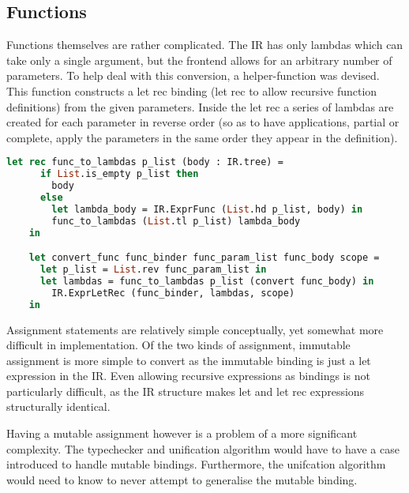 \documentclass{l4proj}
\begin{document}
\subsection{Functions}
Functions themselves are rather complicated.
The IR has only lambdas which can take only a single argument, but the frontend allows for an arbitrary number of parameters.
To help deal with this conversion, a helper-function was devised.
This function constructs a let rec binding (let rec to allow recursive function definitions) from the given parameters.
Inside the let rec a series of lambdas are created for each parameter in reverse order (so as to have applications, partial or complete, apply the parameters in the same order they appear in the definition).

\begin{lstlisting}[language=Caml, keepspaces=true, caption=PyFunc frontend's function binding conversion code.]
    let rec func_to_lambdas p_list (body : IR.tree) =
      if List.is_empty p_list then
        body
      else
        let lambda_body = IR.ExprFunc (List.hd p_list, body) in
        func_to_lambdas (List.tl p_list) lambda_body
    in

    let convert_func func_binder func_param_list func_body scope =
      let p_list = List.rev func_param_list in
      let lambdas = func_to_lambdas p_list (convert func_body) in
        IR.ExprLetRec (func_binder, lambdas, scope)
    in
\end{lstlisting}


Assignment statements are relatively simple conceptually, yet somewhat more difficult in implementation.
Of the two kinds of assignment, immutable assignment is more simple to convert as the immutable binding is just a let expression in the IR.
Even allowing recursive expressions as bindings is not particularly difficult, as the IR structure makes let and let rec expressions structurally identical.

Having a mutable assignment however is a problem of a more significant complexity.
The typechecker and unification algorithm would have to have a case introduced to handle mutable bindings.
Furthermore, the unifcation algorithm would need to know to never attempt to generalise the mutable binding.
\end{document}
